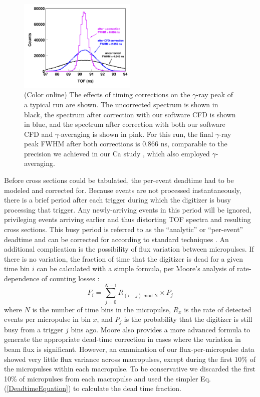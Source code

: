 \documentclass[twocolumn,secnumarabic,amssymb, nobibnotes, aps, prl,
superscriptaddress, nobalancelastpage]{revtex4}
\begin{document}
\begin{figure}
    \includegraphics[width=0.5\textwidth]{figures/TimeCorrections.png}
    \caption{(Color online) The effects of timing corrections on the $\gamma$-ray
        peak of a typical run are shown. The uncorrected spectrum is shown in black,
        the spectrum after correction with our software CFD is shown in blue,
        and the spectrum after correction with both our software CFD and
        $\gamma$-averaging is 
        shown in pink. For this run, the final $\gamma$-ray peak 
        FWHM after both corrections is 0.866 ns, comparable to the precision we
        achieved in our Ca study \cite{Shane2010}, which also employed $\gamma$-
        averaging.
        }
    \label{TimingCorrectionStudy}
\end{figure}

Before cross sections could be tabulated, the per-event deadtime had to be
modeled and corrected for. Because events are not processed
instantaneously, there is a brief period
after each trigger during which the digitizer is busy processing that trigger.
Any newly-arriving events in this period will be ignored,
privileging events arriving earlier and thus distorting
TOF spectra and resulting cross sections. This busy period is referred to as the
``analytic'' or ``per-event'' deadtime and can be corrected for according to standard 
techniques
\cite{Moore1980}. An additional complication is the possibility of flux
variation between micropulses. If there is no variation, the fraction of time
that the digitizer is dead for a given time bin $i$ can be calculated with a
simple formula, per Moore's analysis of rate-dependence of counting losses
\cite{Moore1980}:
\begin{equation}
    F_{i} = \sum^{N-1}_{j=0} R_{(i-j)\text{ mod N}}\times P_{j}
    \label{DeadtimeEquation}
\end{equation}
where $N$ is the number of time bins in the micropulse, $R_{x}$ is the rate of
detected events per micropulse in bin $x$, and $P_{j}$ is the probability that the
digitizer is still busy from a trigger $j$ bins ago.
Moore also provides a more advanced formula to generate the appropriate
dead-time correction in cases where the variation in beam flux 
is significant. However, an examination of our flux-per-micropulse data showed
very little flux variance across macropulses, except during the first 10\%
of the micropulses within each macropulse. To be conservative we discarded the
first 10\% of micropulses from each macropulse and used the simpler Eq.
(\ref{DeadtimeEquation}) to calculate the dead time fraction.
\end{document}
